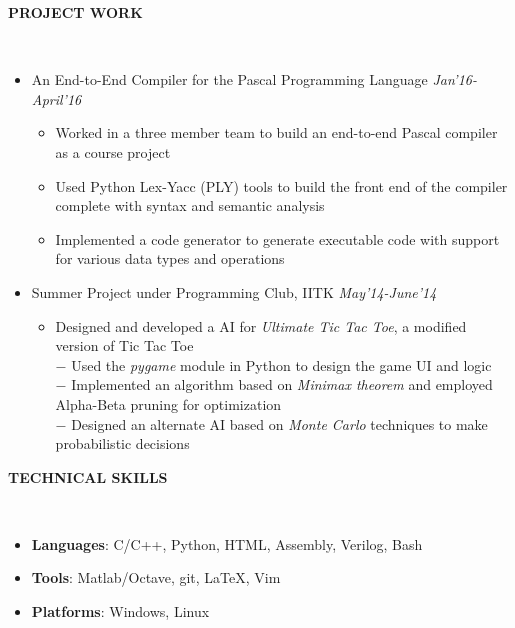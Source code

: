 \documentclass[a4paper,10pt]{article}
\newcommand{\isep}{-2 pt}
\newcommand{\lsep}{-0.5cm}
\newcommand{\resheading}[1]{{\small \colorbox{mygrey}{\begin{minipage}{0.975\textwidth}{\textbf{#1 \vphantom{p\^{E}}}}\end{minipage}}}}
\begin{document}
\resheading{\textbf{PROJECT WORK} }\\[\lsep]
\begin{itemize}
\item\noindent An End-to-End Compiler for the Pascal Programming Language
\hfill\emph{Jan'16-April'16}
\vspace{-2mm}
\begin{itemize}\itemsep \isep
\item \noindent Worked in a three member team to build an end-to-end Pascal compiler as a course project
\item \noindent Used Python Lex-Yacc (PLY) tools to build the front end of the compiler complete with syntax and semantic analysis
\item \noindent Implemented a code generator to generate executable code with support for various data types and operations
\end{itemize}
\item\noindent Summer Project under Programming Club, IITK \hfill\emph{May'14-June'14}
\vspace{-2mm}
\begin{itemize}\itemsep \isep
\item \noindent Designed and developed a AI for \emph{Ultimate Tic Tac Toe}, a modified version of Tic Tac Toe\\
$-$ Used the \emph{pygame} module in Python to design the game UI and logic\\
$-$ Implemented an algorithm based on \emph{Minimax theorem} and employed Alpha-Beta pruning for optimization\\
$-$ Designed an alternate AI based on \emph{Monte Carlo} techniques to make probabilistic decisions\\
\end{itemize}
\end{itemize}

\resheading{\textbf{TECHNICAL SKILLS} }\\[\lsep]
\begin{itemize}\itemsep\isep
\item \noindent \textbf{Languages}: C/C++, Python, HTML, Assembly, Verilog, Bash
\item \noindent \textbf{Tools}: Matlab/Octave, git, \LaTeX, Vim
\item \noindent \textbf{Platforms}: Windows, Linux
\end{itemize}
\end{document}
